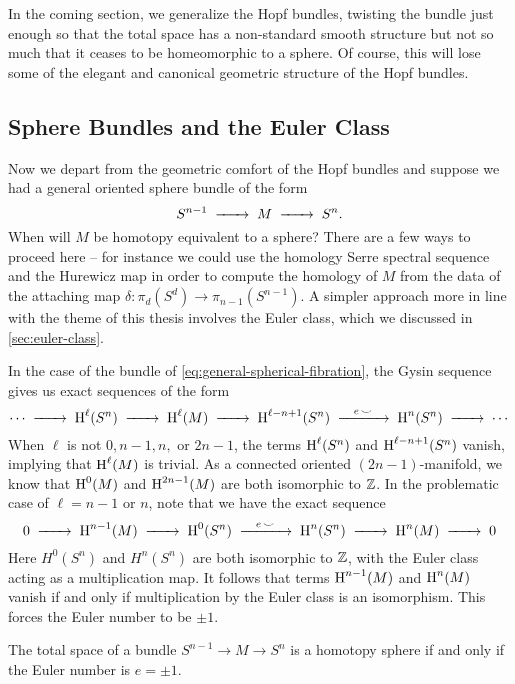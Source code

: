 In the coming section, we generalize the Hopf bundles, twisting the bundle just enough so that the total space has a non-standard smooth structure but not so much that it ceases to be homeomorphic to a sphere.
Of course, this will lose some of the elegant and canonical geometric structure of the Hopf bundles.

\subsection{Sphere Bundles and the Euler Class}

Now we depart from the geometric comfort of the Hopf bundles and suppose we had a general oriented sphere bundle of the form
\begin{equation}\label{eq:general-spherical-fibration}
	S^{n-1}\lkxto M \lkxto S^n.
\end{equation}
When will $M$ be homotopy equivalent to a sphere? There are a few ways to proceed here -- for instance we could use the homology Serre spectral sequence and the Hurewicz map in order to compute the homology of $M$ from the data of the attaching map $\delta : \pi_d(S^d) \to \pi_{n-1}(S^{n-1})$. 
A simpler approach more in line with the theme of this thesis involves the Euler class, which we discussed in \cref{sec:euler-class}.

In the case of the bundle of \cref{eq:general-spherical-fibration}, the Gysin sequence gives us exact sequences of the form
\[
	\cdots \lkxto \H^\ell(S^n) \lkxto \H^{\ell}(M) \lkxto \H^{\ell - n+1}(S^n) \lkxto[e\,\smile] \H^n(S^n) \lkxto \cdots
\]
When $\ell$ is not $0,n-1,n,$ or $2n-1$, the terms $\operatorname{H}^\ell(S^n)$ and $\operatorname{H}^{\ell - n+1}(S^n)$ vanish, implying that $\operatorname{H}^\ell(M)$ is trivial. As a connected oriented $(2n-1)$-manifold, we know that $\operatorname{H}^0(M)$ and $\operatorname{H}^{2n-1}(M)$ are both isomorphic to $\mathbb{Z}$. In the problematic case of $\ell = n-1$ or $n$, note that we have the exact sequence
\[
	0 \lkxto \H^{n-1}(M) \lkxto \H^0(S^n) \lkxto[e\,\smile] \H^n(S^n) \lkxto \H^n(M) \lkxto 0
\]
Here $H^0(S^n)$ and $H^n(S^n)$ are both isomorphic to $\mathbb{Z}$, with the Euler class acting as a multiplication map. It follows that terms $\operatorname{H}^{n-1}(M)$ and $\operatorname{H}^n(M)$ vanish if and only if multiplication by the Euler class is an isomorphism. This forces the Euler number to be $\pm 1$.

\begin{proposition}\label{prop:homotopy-type-spherical-bundle}
	The total space of a bundle $S^{n-1} \to M \to S^n$ is a homotopy sphere if and only if the Euler number is $e=\pm 1$.
\end{proposition}

